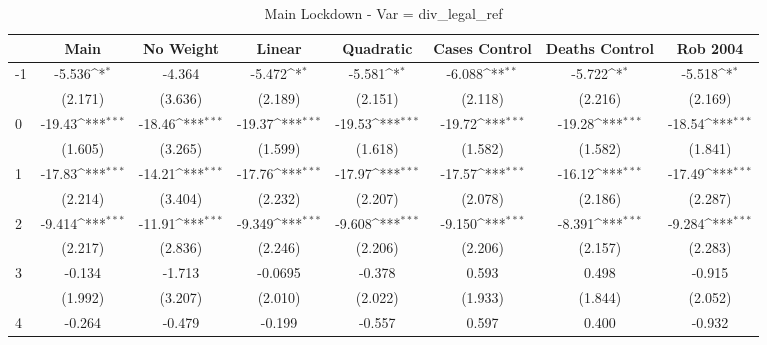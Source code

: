 \documentclass{article}
\begin{document}
{
\def\sym#1{\ifmmode^{#1}\else\(^{#1}\)\fi}
\begin{longtable}{l*{7}{c}}
\caption{Main Lockdown - Var = div\_legal\_ref}\\
\hline\hline\endfirsthead\hline\endhead\hline\endfoot\endlastfoot
                &\multicolumn{1}{c}{Main}&\multicolumn{1}{c}{No Weight}&\multicolumn{1}{c}{Linear}&\multicolumn{1}{c}{Quadratic}&\multicolumn{1}{c}{Cases Control}&\multicolumn{1}{c}{Deaths Control}&\multicolumn{1}{c}{Rob 2004}\\
\hline
-1              &   -5.536\sym{*}  &   -4.364         &   -5.472\sym{*}  &   -5.581\sym{*}  &   -6.088\sym{**} &   -5.722\sym{*}  &   -5.518\sym{*}  \\
                &  (2.171)         &  (3.636)         &  (2.189)         &  (2.151)         &  (2.118)         &  (2.216)         &  (2.169)         \\
0               &   -19.43\sym{***}&   -18.46\sym{***}&   -19.37\sym{***}&   -19.53\sym{***}&   -19.72\sym{***}&   -19.28\sym{***}&   -18.54\sym{***}\\
                &  (1.605)         &  (3.265)         &  (1.599)         &  (1.618)         &  (1.582)         &  (1.582)         &  (1.841)         \\
1               &   -17.83\sym{***}&   -14.21\sym{***}&   -17.76\sym{***}&   -17.97\sym{***}&   -17.57\sym{***}&   -16.12\sym{***}&   -17.49\sym{***}\\
                &  (2.214)         &  (3.404)         &  (2.232)         &  (2.207)         &  (2.078)         &  (2.186)         &  (2.287)         \\
2               &   -9.414\sym{***}&   -11.91\sym{***}&   -9.349\sym{***}&   -9.608\sym{***}&   -9.150\sym{***}&   -8.391\sym{***}&   -9.284\sym{***}\\
                &  (2.217)         &  (2.836)         &  (2.246)         &  (2.206)         &  (2.206)         &  (2.157)         &  (2.283)         \\
3               &   -0.134         &   -1.713         &  -0.0695         &   -0.378         &    0.593         &    0.498         &   -0.915         \\
                &  (1.992)         &  (3.207)         &  (2.010)         &  (2.022)         &  (1.933)         &  (1.844)         &  (2.052)         \\
4               &   -0.264         &   -0.479         &   -0.199         &   -0.557         &    0.597         &    0.400         &   -0.932         \\

\end{longtable}}
\end{document}
